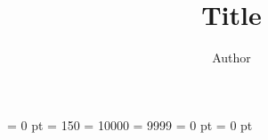 \usepackage[top=3cm, bottom=3cm, left=3.5cm, right=2.5cm]{geometry}



\title{Title}
\author{Author}
\newcommand{\university}{University}
\newcommand{\subtitle}{Subtitle}
\newcommand{\faculty}{Faculty}
\newcommand{\titledate}{Date}
\newcommand{\examination}{Examiner}

\lstset{xleftmargin=2em}

\emergencystretch = 0 pt
\pretolerance = 150
\tolerance = 10000
\hbadness = 9999
\hfuzz = 0 pt
\vfuzz = 0 pt

\titleformat{\chapter}{\Huge\bfseries}{\thechapter}{1em}{\Huge\bfseries}
